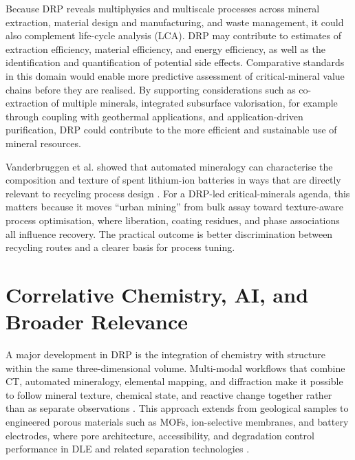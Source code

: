 \documentclass[12pt,a4paper]{article}
\begin{document}
Because DRP reveals multiphysics and multiscale processes across mineral extraction, material design and manufacturing, and waste management, it could also complement life-cycle analysis (LCA). DRP may contribute to estimates of extraction efficiency, material efficiency, and energy efficiency, as well as the identification and quantification of potential side effects. Comparative standards in this domain would enable more predictive assessment of critical-mineral value chains before they are realised. By supporting considerations such as co-extraction of multiple minerals, integrated subsurface valorisation, for example through coupling with geothermal applications, and application-driven purification, DRP could contribute to the more efficient and sustainable use of mineral resources.

\begin{tcolorbox}[enhanced, colback=green!3!white, colframe=green!35!black, title=\textbf{Illustrative Case Study: Black-Mass Characterisation}, fonttitle=\bfseries, arc=1.5mm, boxrule=0.8pt]
Vanderbruggen et al. showed that automated mineralogy can characterise the composition and texture of spent lithium-ion batteries in ways that are directly relevant to recycling process design \cite{battery_blackmass_2021}. For a DRP-led critical-minerals agenda, this matters because it moves ``urban mining'' from bulk assay toward texture-aware process optimisation, where liberation, coating residues, and phase associations all influence recovery. The practical outcome is better discrimination between recycling routes and a clearer basis for process tuning.
\end{tcolorbox}

\section{Correlative Chemistry, AI, and Broader Relevance}
A major development in DRP is the integration of chemistry with structure within the same three-dimensional volume. Multi-modal workflows that combine CT, automated mineralogy, elemental mapping, and diffraction make it possible to follow mineral texture, chemical state, and reactive change together rather than as separate observations \cite{buyse_correlative_2023, koch_geomet_2019, gu_automated_mineralogy_2014}. This approach extends from geological samples to engineered porous materials such as MOFs, ion-selective membranes, and battery electrodes, where pore architecture, accessibility, and degradation control performance in DLE and related separation technologies \cite{farber_science_2025}.
\end{document}
